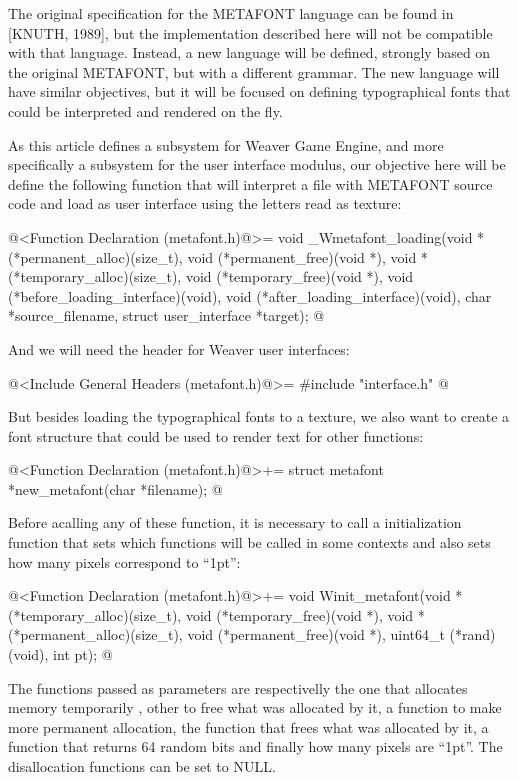 The original specification for the METAFONT language can be found in
[KNUTH, 1989], but the implementation described here will not be
compatible with that language. Instead, a new language will be
defined, strongly based on the original METAFONT, but with a different
grammar. The new language will have similar objectives, but it will be
focused on defining typographical fonts that could be interpreted and
rendered on the fly.

As this article defines a subsystem for Weaver Game Engine, and more
specifically a subsystem for the user interface modulus, our objective
here will be define the following function that will interpret a file
with METAFONT source code and load as user interface using the letters
read as texture:

\iniciocodigo
@<Function Declaration (metafont.h)@>=
void _Wmetafont_loading(void *(*permanent_alloc)(size_t),
		      void (*permanent_free)(void *),
		      void *(*temporary_alloc)(size_t),
		      void (*temporary_free)(void *),
		      void (*before_loading_interface)(void),
		      void (*after_loading_interface)(void),
		      char *source_filename,
                      struct user_interface *target);
@
\fimcodigo

And we will need the header for Weaver user interfaces:

\iniciocodigo
@<Include General Headers (metafont.h)@>=
#include "interface.h"
@
\fimcodigo

But besides loading the typographical fonts to a texture, we also want
to create a font structure that could be used to render text for other
functions:

\iniciocodigo
@<Function Declaration (metafont.h)@>+=
struct metafont *new_metafont(char *filename);
@
\fimcodigo

Before acalling any of these function, it is necessary to call a
initialization function that sets which functions will be called in
some contexts and also sets how many pixels correspond to ``1pt'':

\iniciocodigo
@<Function Declaration (metafont.h)@>+=
void Winit_metafont(void *(*temporary_alloc)(size_t),
                    void (*temporary_free)(void *),
                    void *(*permanent_alloc)(size_t),
                    void (*permanent_free)(void *),
                    uint64_t (*rand)(void), int pt);
@
\fimcodigo

The functions passed as parameters are respectivelly the one that
allocates memory temporarily , other to free what was allocated by it,
a function to make more permanent allocation, the function that frees
what was allocated by it, a function that returns 64 random bits and
finally how many pixels are ``1pt''. The disallocation functions can
be set to NULL.

